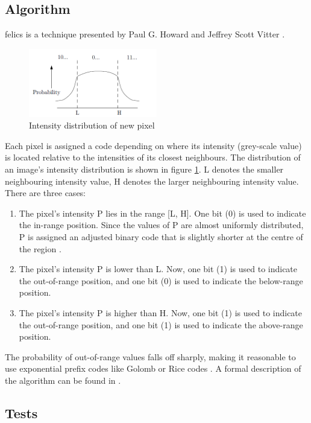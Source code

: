 \subsection{Algorithm}
\gls{felics} is a technique presented by Paul G. Howard and Jeffrey Scott Vitter \cite{howard_fast_1993}.
\begin{figure}[h]
    \centering
    \includegraphics[width=0.5\textwidth]{figs/probability_intensity_P.png}
    \caption{Intensity distribution of new pixel \cite{howard_fast_1993}}
    \label{fig:dist}
\end{figure}
Each pixel is assigned a code depending on where its intensity (grey-scale value) is located relative to the intensities of its closest neighbours. The distribution of an image's intensity distribution is shown in figure \ref{fig:dist}. L denotes the smaller neighbouring intensity value, H denotes the larger neighbouring intensity value. There are three cases:
\begin{enumerate}
    \item The pixel's intensity P lies in the range [L, H]. One bit (0) is used to indicate the in-range position. Since the values of P are almost uniformly distributed, P is assigned an adjusted binary code that is slightly shorter at the centre of the region \cite{salomon_image_2010}.
    \item The pixel's intensity P is lower than L. Now, one bit (1) is used to indicate the out-of-range position, and one bit (0) is used to indicate the below-range position. 
    \item The pixel's intensity P is higher than H. Now, one bit (1) is used to indicate the out-of-range position, and one bit (1) is used to indicate the above-range position.  
\end{enumerate}

The probability of out-of-range values falls off sharply, making it reasonable to use exponential prefix codes like Golomb or Rice codes \cite{howard_fast_1993}.
A formal description of the algorithm can be found in \cite{howard_fast_1993}.

\subsection{Tests}


